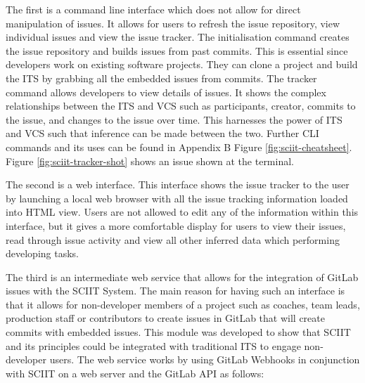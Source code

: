 \documentclass{mproj}
\begin{document}
The first is a command line interface which does not allow for direct manipulation of issues. It allows for users to refresh the issue repository, view individual issues and view the issue tracker. The initialisation command creates the issue repository and builds issues from past commits. This is essential since developers work on existing software projects. They can clone a project and build the ITS by grabbing all the embedded issues from commits. The tracker command allows developers to view details of issues. It shows the complex relationships between the ITS and VCS such as participants, creator, commits to the issue, and changes to the issue over time. This harnesses the power of ITS and VCS such that inference can be made between the two. Further CLI commands and its uses can be found in Appendix B Figure \ref{fig:sciit-cheatsheet}. Figure \ref{fig:sciit-tracker-shot} shows an issue shown at the terminal.

The second is a web interface. This interface shows the issue tracker to the user by launching a local web browser with all the issue tracking information loaded into HTML view. Users are not allowed to edit any of the information within this interface, but it gives a more comfortable display for users to view their issues, read through issue activity and view all other inferred data which performing developing tasks.

The third is an intermediate web service that allows for the integration of GitLab issues with the SCIIT System. The main reason for having such an interface is that it allows for non-developer members of a project such as coaches, team leads, production staff or contributors to create issues in GitLab that will create commits with embedded issues. This module was developed to show that SCIIT and its principles could be integrated with traditional ITS to engage non-developer users. The web service works by using GitLab Webhooks in conjunction with SCIIT on a web server and the GitLab API as follows:
\end{document}
